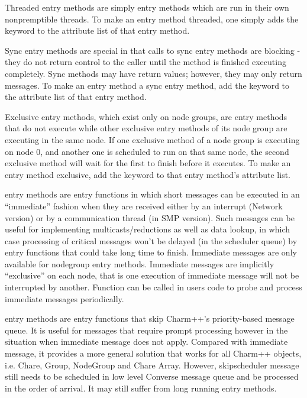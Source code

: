 Threaded entry methods are simply entry
methods which are run in their own nonpremptible threads.  To make an
entry method threaded, one simply adds the keyword
 to the attribute list of that entry method.

Sync entry methods are special in that calls to
sync entry methods are blocking - they do not return control to the caller
until the method is finished executing completely.  Sync methods may have
return values; however, they may only return messages.  To make an entry method a sync entry method, add the keyword  to the
attribute list of that entry method.

Exclusive entry methods, which exist only on node groups, are
entry methods that do not execute while other exclusive
entry methods of its node group are executing in the same
node.  If one exclusive method of a node group is executing on node 0, and
another one is scheduled to run on that same node, the second exclusive method
will wait for the first to finish before it executes.  To make an entry method exclusive, add the keyword  to that
entry method's attribute list.

 entry methods are entry functions in which 
short messages can be executed in an ``immediate'' fashion when they are 
received either by an interrupt (Network version) or by a communication 
thread (in SMP version). Such messages can be useful for 
implementing multicasts/reductions as well as data lookup, in which case 
processing of critical messages won't be delayed (in the scheduler queue) 
by entry functions that could take long time to finish. 
Immediate messages are only available for nodegroup entry methods.
Immediate messages are implicitly ``exclusive'' on each node, that is 
one execution of immediate message will not be interrupted by another.
Function  can be called in users code to 
probe and process immediate messages periodically.

 entry methods are entry functions 
that skip Charm++'s priority-based message queue. It is useful for messages 
that require prompt processing however in the situation when immediate message 
does not apply. Compared with immediate message, it provides a more general
solution that works for all Charm++ objects, i.e. Chare, Group, NodeGroup 
and Chare Array. However, skipscheduler message still needs to be 
scheduled in low level Converse message queue and be processed in the order 
of arrival. It may still suffer from long running entry methods.




